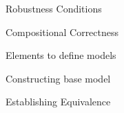 \documentclass[notes, xcolor = dvipsnames]{beamer}
\begin{document}
    \begin{frame}{Robustness Conditions}
        


    \end{frame}

    \begin{frame}{Compositional Correctness}
        

    \end{frame}

    \begin{frame}{Elements to define models} 


    \end{frame}

    \begin{frame}{Constructing base model}


    \end{frame}

    \begin{frame}{Establishing Equivalence} 


    \end{frame}

\end{document}
